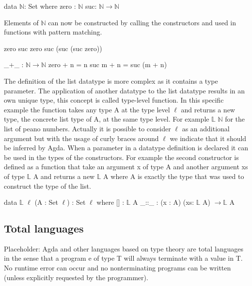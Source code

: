 \begin{codesnippet}[mathescape=true, caption={Definition of the peano natural numbers datatype in Agda}, label={codeSnippet:natural_number}]
data $\mathbb{N}$: Set where
  zero : $\mathbb{N}$
  suc: $\mathbb{N} \rightarrow \mathbb{N}$
\end{codesnippet}

Elements of $\mathbb{N}$ can now be constructed by calling the constructors and used in functions with pattern matching.
\begin{codesnippet}[mathescape=true, caption={Some peano numbers}, label={codeSnippet:natural_number_constructor}]
zero
suc zero
suc (suc (suc zero))
\end{codesnippet}
\begin{codesnippet}[mathescape=true, caption={Peano numbers addition}, label={codeSnippet:natural_number_addition}]
_+_ : $\mathbb{N} \rightarrow \mathbb{N}$
zero + n = n
suc m + n = suc (m + n)
\end{codesnippet}

The definition of the list datatype is more complex as it contains a type parameter. The application of another datatype to the list datatype results in an own unique type, this concept is called type-level function. 
In this specific example the function takes any type A at the type level $\ell$ and returns a new type, the concrete list type of A, at the same type level.
For example $\mathbb{L}$ $\mathbb{N}$ for the list of peano numbers.
Actually it is possible to consider $\ell$ as an additional argument but with the usage of curly braces around $\ell$ we indicate that it should be inferred by Agda.
When a parameter in a datatype definition is declared it can be used in the types of the constructors. For example the second constructor is defined as a function that take an argument x of type A and another argument xs of type $\mathbb{L}$ A and returns a new $\mathbb{L}$ A where A is exactly the type that was used to construct the type of the list.
\begin{codesnippet}[mathescape=true, caption={Definition of the list datatype in Agda}, label={codeSnippet:list_datatype}]
data $\mathbb{L}$ {$\ell$} (A : Set $\ell$) : Set $\ell$ where
  [] : $\mathbb{L}$ A
  _::_ : (x : A) (xs: $\mathbb{L}$ A) $\rightarrow \mathbb{L}$ A
\end{codesnippet}


\subsection{Total languages}
Placeholder: Agda and other languages based on type theory are total languages in the sense that a program e of type T will always terminate with a value in T. 
No runtime error can occur and no nonterminating programs can be written (unless explicitly requested by the programmer)\cite{AgdaReadTheDocs}.

